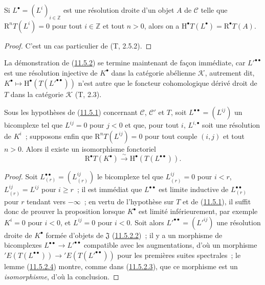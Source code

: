 \begin{lemma}[11.5.2.4]
\label{0.11.5.2.4-fr}
Si $L^\bullet=(L^i)_{i\in\mathbb Z}$ est une résolution droite d'un objet $A$
de $\mathcal C$ telle que $\mathrm R^nT(L^i)=0$ pour tout $i\in\mathbb Z$ et
tout $n>0$, alors on a
$\mathrm H^\bullet T(L^\bullet)=\mathrm R^\bullet T(A)$.
\end{lemma}

\begin{proof}
C'est un cas particulier de (T, 2.5.2).
\end{proof}

\begin{env}[11.5.2.5]
\label{0.11.5.2.5-fr}
La démonstration de (\hyperref[0.11.5.2-fr]{11.5.2}) se termine maintenant de
façon immédiate, car $L'^{\bullet\bullet}$ est une résolution injective de
$K^\bullet$ dans la catégorie abélienne $\mathcal K$, autrement dit,
$K^\bullet\mapsto\mathrm H^\bullet(T(L'^{\bullet\bullet}))$ n'est autre que
le foncteur cohomologique dérivé droit de $T$ dans la catégorie $\mathcal K$
(T, 2.3).
\end{env}

\begin{proposition}[11.5.3]
\label{0.11.5.3-fr}
Sous les hypothèses de (\hyperref[0.11.5.1-fr]{11.5.1}) concernant
$\mathcal C$, $\mathcal C'$ et $T$, soit
$L^{\bullet\bullet}=(L^{ij})$ un bicomplexe tel que $L^{ij}=0$ pour $j<0$ et
que, pour tout $i$, $L^{i,\bullet}$ soit une résolution de $K^i$~; supposons
enfin que $\mathrm R^nT(L^{ij})=0$ pour tout couple $(i,j)$ et tout $n>0$.
Alors il existe un isomorphisme fonctoriel
\[
  \label{0.11.5.3.1-fr}
  \mathrm R^\bullet T(K^\bullet)\xrightarrow{\sim}
  \mathrm H^\bullet(T(L^{\bullet\bullet})).
  \tag{11.5.3.1}
\]
\end{proposition}

\begin{proof}
Soit $L_{(r)}^{\bullet\bullet}=(L_{(r)}^{ij})$ le bicomplexe tel que
$L_{(r)}^{ij}=0$ pour $i<r$, $L_{(r)}^{ij}=L^{ij}$ pour $i\geq r$~; il est
immédiat que $L^{\bullet\bullet}$ est limite inductive de
$L_{(r)}^{\bullet\bullet}$ pour $r$ tendant vers $-\infty$~; en vertu de
l'hypothèse sur $T$ et de (\hyperref[0.11.5.1-fr]{11.5.1}), il suffit donc de
prouver la proposition lorsque $K^\bullet$ est limité inférieurement, par
exemple $K^i=0$ pour $i<0$, et $L^{ij}=0$ pour $i<0$. Soit alors
$L'^{\bullet\bullet}=(L'^{ij})$ une résolution droite de $K^\bullet$ formée
d'objets de $\mathfrak J$ (\hyperref[0.11.5.2.2-fr]{11.5.2.2})~; il y a un
morphisme de bicomplexes
$L^{\bullet\bullet}\to L'^{\bullet\bullet}$ compatible avec les
augmentations, d'où un morphisme
$'E(T(L^{\bullet\bullet}))\to{}'E(T(L'^{\bullet\bullet}))$ pour les premières
suites spectrales~; le lemme (\hyperref[0.11.5.2.4-fr]{11.5.2.4}) montre,
comme dans (\hyperref[0.11.5.2.3-fr]{11.5.2.3}), que ce morphisme est un
\emph{isomorphisme}, d'où la conclusion.
\end{proof}

